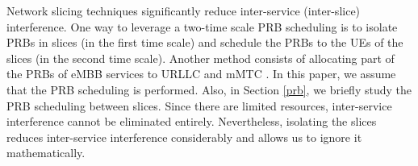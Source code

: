 \documentclass[lettersize,journal]{IEEEtran}
\begin{document}
Network slicing techniques significantly reduce inter-service (inter-slice) interference.
One way to leverage a two-time scale PRB scheduling is to isolate PRBs in slices (in the first time scale) and schedule the PRBs to the UEs of the slices (in the second time scale). Another method consists of allocating part of the PRBs of eMBB services to URLLC and mMTC \cite{alsenwi2021intelligent, setayesh2020joint, mei2021intelligent}. In this paper, we assume that the PRB scheduling is performed. Also, in Section \ref{prb}, we briefly study the PRB scheduling between slices.
Since there are limited resources, inter-service interference cannot be eliminated entirely. Nevertheless, isolating the slices reduces inter-service interference considerably and allows us to ignore it mathematically.
\end{document}
